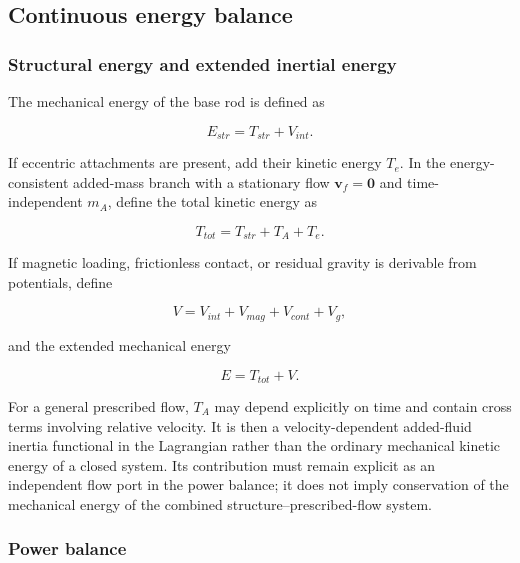 \subsection{Continuous energy balance}\label{sec:rod-1-7}

\subsubsection{Structural energy and extended inertial energy}\label{sec:rod-1-7-1}

The mechanical energy of the base rod is defined as

\begin{equation}
\label{eq:rod-1-99}
E_{str} = T_{str} + V_{int}.
\end{equation}

If eccentric attachments are present, add their kinetic energy \(T_{e}\). In the energy-consistent added-mass branch with a stationary flow \(\mathbf{v}_{f} = \mathbf{0}\) and time-independent \(m_{A}\), define the total kinetic energy as

\begin{equation}
\label{eq:rod-1-100}
T_{tot} = T_{str} + T_{A} + T_{e}.
\end{equation}

If magnetic loading, frictionless contact, or residual gravity is derivable from potentials, define

\begin{equation}
\label{eq:rod-1-101}
V = V_{int} + V_{mag} + V_{cont} + V_{g},
\end{equation}

and the extended mechanical energy

\begin{equation}
\label{eq:rod-1-102}
\boxed{E = T_{tot} + V.}
\end{equation}

For a general prescribed flow, \(T_{A}\) may depend explicitly on time and contain cross terms involving relative velocity. It is then a velocity-dependent added-fluid inertia functional in the Lagrangian rather than the ordinary mechanical kinetic energy of a closed system. Its contribution must remain explicit as an independent flow port in the power balance; it does not imply conservation of the mechanical energy of the combined structure--prescribed-flow system.

\subsubsection{Power balance}\label{sec:rod-1-7-2}

